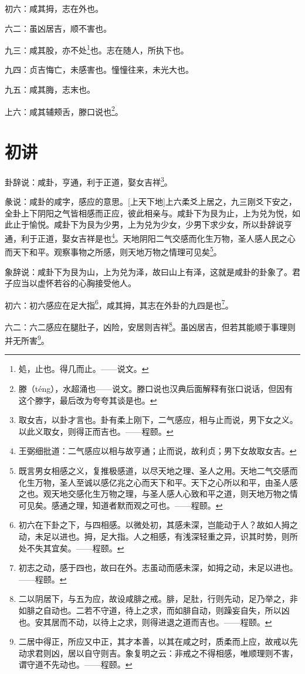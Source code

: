 \documentclass[12pt,oneside]{book}
\begin{document}
初六：咸其拇，志在外也。

六二：虽凶居吉，顺不害也。

九三：咸其股，亦不处\footnote{処，止也。得几而止。——说文。}也。志在随人，所执下也。

九四：贞吉悔亡，未感害也。憧憧往来，未光大也。

九五：咸其脢，志末也。

上六：咸其辅颊舌，滕口说也\footnote{滕（téng），水超涌也——说文。滕口说也汉典后面解释有张口说话，但因有这个滕字，最后改为夸夸其谈是也。}。

\section{初讲}
卦辞说：咸卦，亨通，利于正道，娶女吉祥\footnote{取女吉，以卦才言也。卦有柔上刚下，二气感应，相与止而说，男下女之义。以此义取女，则得正而吉也。——程颐。}。

彖说：咸卦的咸字，感应的意思。[上天下地]上六柔爻上居之，九三刚爻下安之，全卦上下阴阳之气皆相感而正应，彼此相亲与。咸卦下为艮为止，上为兑为悦，如此止于愉悦。咸卦下为艮为少男，上为兑为少女，少男下求少女，所以卦辞说亨通，利于正道，娶女吉祥是也\footnote{王弼细批道：二气感应以相与故亨通；止而说，故利贞；男下女故取女吉。}。天地阴阳二气交感而化生万物，圣人感人民之心而天下和平。观察事物之所感，则天地万物之情理可见矣\footnote{既言男女相感之义，复推极感道，以尽天地之理、圣人之用。天地二气交感而化生万物，圣人至诚以感亿兆之心而天下和平。天下之心所以和平，由圣人感之也。观天地交感化生万物之理，与圣人感人心致和平之道，则天地万物之情可见矣。感通之理，知道者默而观之可也。——程颐。}。

象辞说：咸卦下为艮为山，上为兑为泽，故曰山上有泽，这就是咸卦的卦象了。君子应当以虚怀若谷的心胸接受他人。

初六：初六感应在足大指\footnote{初六在下卦之下，与四相感。以微处初，其感未深，岂能动于人？故如人拇之动，未足以进也。拇，足大指。人之相感，有浅深轻重之异，识其时势，则所处不失其宜矣。——程颐。}，咸其拇，其志在外卦的九四是也\footnote{初志之动，感于四也，故曰在外。志虽动而感未深，如拇之动，未足以进也。——程颐。}。

六二：六二感应在腿肚子，凶险，安居则吉祥\footnote{二以阴居下，与五为应，故设咸腓之戒。腓，足肚，行则先动，足乃举之，非如腓之自动也。二若不守道，待上之求，而如腓自动，则躁妄自失，所以凶也。安其居而不动，以待上之求，则得进退之道而吉也。——程颐。}。虽凶居吉，但若其能顺于事理则并无所害\footnote{二居中得正，所应又中正，其才本善，以其在咸之时，质柔而上应，故戒以先动求君则凶，居以自守则吉。象复明之云：非戒之不得相感，唯顺理则不害，谓守道不先动也。——程颐。}。
\end{document}
